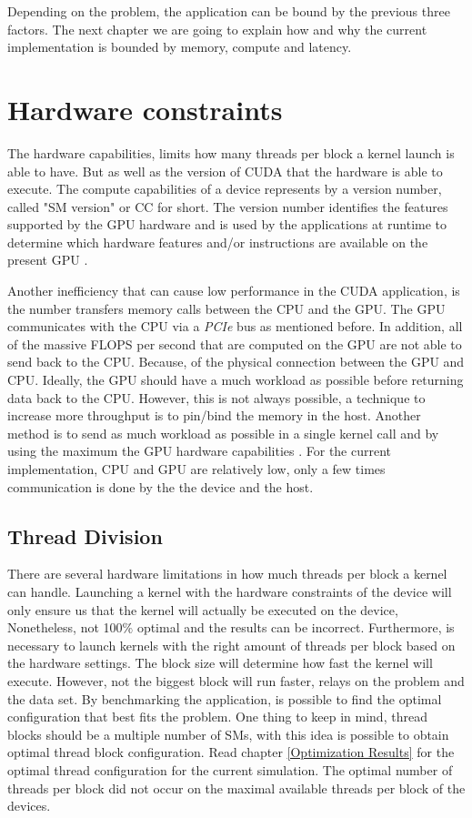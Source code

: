 Depending on the problem, the application can be bound by the previous three factors. The next chapter we are going to explain how and why the current implementation is bounded by memory, compute and latency.

\section{Hardware constraints}


The hardware capabilities, limits how many threads per block a kernel launch is able to have. But as well as the version of CUDA that the hardware is able to execute. The compute capabilities of a device represents by a version number, called "SM version" or CC for short. The version number identifies the features supported by the GPU hardware and is used by the applications at runtime to determine which hardware features and/or instructions are available on the present GPU \cite{tool}. 

Another inefficiency that can cause low performance in the CUDA application, is the number transfers memory calls between the CPU and the GPU. The GPU communicates with the CPU via a \textit{PCIe} bus as mentioned before. In addition, all of the massive FLOPS per second that are computed on the GPU are not able to send back to the CPU. Because, of the physical connection between the GPU and CPU. Ideally, the GPU should have a much workload as possible before returning data back to the CPU. However, this is not always possible, a technique to increase more throughput is to pin/bind the memory in the host. Another method is to send as much workload as possible in a single kernel call and by using the maximum the GPU hardware capabilities \cite{practices}. For the current implementation, CPU and GPU are relatively low, only a few times communication is done by the the device and the host.

\subsection{Thread Division}

There are several hardware limitations in how much threads per block a kernel can handle. Launching a kernel with the hardware constraints of the device will only ensure us that the kernel will actually be executed on the device, Nonetheless, not 100$\%$ optimal and the results can be incorrect. Furthermore, is necessary to launch kernels with the right amount of threads per block based on the hardware settings. The block size will determine how fast the kernel will execute. However, not the biggest block will run faster, relays on the problem and the data set. By benchmarking the application, is possible to find the optimal configuration that best fits the problem. One thing to keep in mind, thread blocks should be a multiple number of SMs, with this idea is possible to obtain optimal thread block configuration. Read chapter \ref{Optimization Results} for the optimal thread configuration for the current simulation. The optimal number of threads per block did not occur on the maximal available threads per block of the devices.

